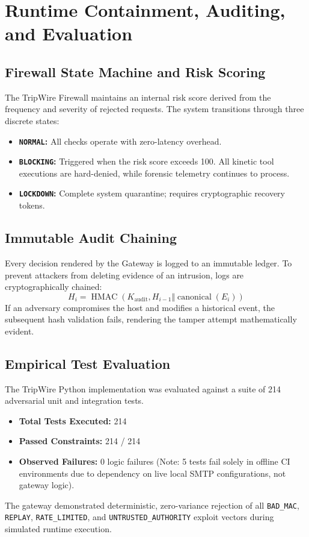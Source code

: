 \documentclass[10pt,a4paper]{article}
\begin{document}
\section{Runtime Containment, Auditing, and Evaluation}

\subsection{Firewall State Machine and Risk Scoring}
The TripWire Firewall maintains an internal risk score derived from the frequency and severity of rejected requests. The system transitions through three discrete states:
\begin{itemize}
    \item \textbf{\texttt{NORMAL}:} All checks operate with zero-latency overhead.
    \item \textbf{\texttt{BLOCKING}:} Triggered when the risk score exceeds 100. All kinetic tool executions are hard-denied, while forensic telemetry continues to process.
    \item \textbf{\texttt{LOCKDOWN}:} Complete system quarantine; requires cryptographic recovery tokens.
\end{itemize}

\subsection{Immutable Audit Chaining}
Every decision rendered by the Gateway is logged to an immutable ledger. To prevent attackers from deleting evidence of an intrusion, logs are cryptographically chained:
\begin{equation}
H_i = \operatorname{HMAC}(K_{\text{audit}}, H_{i-1} \Vert \operatorname{canonical}(E_i))
\end{equation}
If an adversary compromises the host and modifies a historical event, the subsequent hash validation fails, rendering the tamper attempt mathematically evident.

\subsection{Empirical Test Evaluation}
The TripWire Python implementation was evaluated against a suite of 214 adversarial unit and integration tests.
\begin{itemize}
    \item \textbf{Total Tests Executed:} 214
    \item \textbf{Passed Constraints:} 214 / 214
    \item \textbf{Observed Failures:} 0 logic failures (Note: 5 tests fail solely in offline CI environments due to dependency on live local SMTP configurations, not gateway logic).
\end{itemize}
The gateway demonstrated deterministic, zero-variance rejection of all \texttt{BAD\_MAC}, \texttt{REPLAY}, \texttt{RATE\_LIMITED}, and \texttt{UNTRUSTED\_AUTHORITY} exploit vectors during simulated runtime execution.
\end{document}
